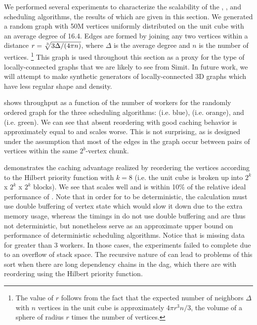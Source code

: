 We performed several experiments to characterize the scalability
of the , , and  scheduling
algorithms, the results of which are given in this section.  
We generated a random graph with 50M vertices uniformly
distributed on the unit cube with an
average degree of 16.4.  Edges are formed by joining any two vertices 
within a distance $r=\sqrt[\leftroot{-1}\uproot{1}3]{3\Delta/(4\pi n)}$, 
where $\Delta$ is the average degree and $n$ is the number of vertices.
\footnote{The value of $r$ follows from the fact that the expected 
number of neighbors $\Delta$ with $n$ vertices in the unit cube
is approximately $4\pi r^3 n/ 3$, the volume of a sphere of radius
$r$ times the number of vertices.}  This graph is used throughout
this section as a proxy for the type of locally-connected graphs
that we are likely to see from Simit.  In future work, we will
attempt to make synthetic generators of locally-connected 3D graphs
which have less regular shape and density.


 shows throughput as a function of the number
of workers for the randomly ordered graph for the three scheduling
algorithms:  (i.e. blue),  (i.e. orange), and
 (i.e. green).  We can see that absent reordering
with good caching behavior  is approximately equal to
 and scales worse.  This is not surprising, as 
 is designed under the assumption that most of the edges
in the graph occur between pairs of vertices within the same $2^b$-vertex 
chunk.  

 demonstrates the caching advantage realized
by reordering the vertices according to the Hilbert priority function
with $k=8$ (i.e. the unit cube is broken up into $2^k$ x $2^k$ x $2^k$ blocks).
We see that  scales well and is within 10\% of the relative
ideal performance of .  Note that in order for  to
be deterministic, the calculation must use double buffering of vertex state 
which would slow it down due to the extra memory usage, whereas the  
timings in  do not use double buffering and
are thus not deterministic, but nonetheless serve as an approximate 
upper bound on performance of deterministic scheduling algorithms.  Notice
that  is missing data for greater than 3 workers.
In those cases, the experiments failed to complete due to an overflow of
stack space.  The recursive nature of  can lead to
problems of this sort when there are long dependency chains in the 
dag, which there are with reordering using the Hilbert priority function. 

